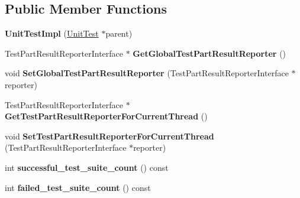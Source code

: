 \subsection*{Public Member Functions}
\begin{DoxyCompactItemize}
\item 
\mbox{\label{classtesting_1_1internal_1_1UnitTestImpl_a5fb75faa88ee71f26e16473455b70839}} 
{\bfseries Unit\+Test\+Impl} (\mbox{\hyperlink{classtesting_1_1UnitTest}{Unit\+Test}} $\ast$parent)
\item 
\mbox{\label{classtesting_1_1internal_1_1UnitTestImpl_a1cd291fd6751654924362164735d4b49}} 
Test\+Part\+Result\+Reporter\+Interface $\ast$ {\bfseries Get\+Global\+Test\+Part\+Result\+Reporter} ()
\item 
\mbox{\label{classtesting_1_1internal_1_1UnitTestImpl_a892b0e25b28af5e4400cf6fac336f2d8}} 
void {\bfseries Set\+Global\+Test\+Part\+Result\+Reporter} (Test\+Part\+Result\+Reporter\+Interface $\ast$reporter)
\item 
\mbox{\label{classtesting_1_1internal_1_1UnitTestImpl_a5fb3dd8bc839e10b62eba07790704132}} 
Test\+Part\+Result\+Reporter\+Interface $\ast$ {\bfseries Get\+Test\+Part\+Result\+Reporter\+For\+Current\+Thread} ()
\item 
\mbox{\label{classtesting_1_1internal_1_1UnitTestImpl_a1403fc10aebcc64479c5ee980c9b4eb4}} 
void {\bfseries Set\+Test\+Part\+Result\+Reporter\+For\+Current\+Thread} (Test\+Part\+Result\+Reporter\+Interface $\ast$reporter)
\item 
\mbox{\label{classtesting_1_1internal_1_1UnitTestImpl_a959a2246e4ea23e8c8fb4f4d35846a1d}} 
int {\bfseries successful\+\_\+test\+\_\+suite\+\_\+count} () const
\item 
\mbox{\label{classtesting_1_1internal_1_1UnitTestImpl_abeac4631ea379289c3592b5ecb753fe9}} 
int {\bfseries failed\+\_\+test\+\_\+suite\+\_\+count} () const
\item 
\mbox{\label{classtesting_1_1internal_1_1UnitTestImpl_af4d396fe75580e5b7b0f60762f17b24a}} 

\end{DoxyCompactItemize}
